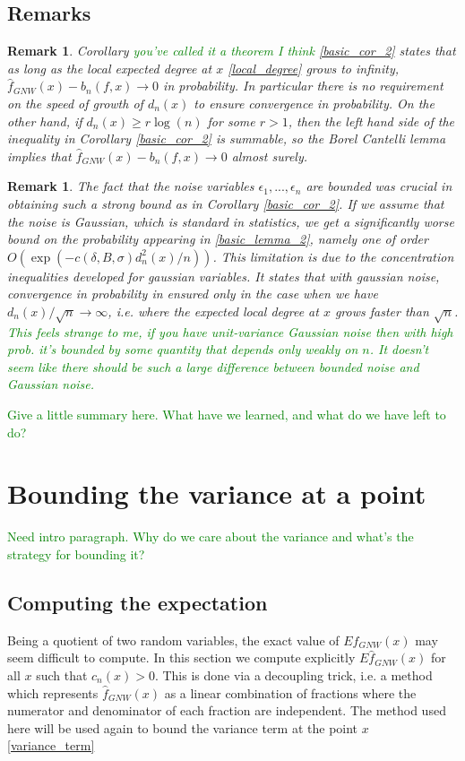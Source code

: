 \documentclass{article}
\newtheorem{remark}[theorem]{Remark}
\newcommand\SB[1]{\textcolor{green}{#1}}
\begin{document}
\subsection{Remarks}

\begin{remark}
Corollary \SB{you've called it a theorem I think} \ref{basic_cor_2} states that as long as the local expected degree at $x$ \ref{local_degree} grows to infinity, $\hat{f}_{GNW}(x)-b_n(f,x)\to 0$ in probability. In particular there is no requirement on the speed of growth of $d_n(x)$ to ensure convergence in probability. On the other hand, if $d_n(x)\geq r\log(n)$ for some $r>1$, then the left hand side of the inequality in Corollary \ref{basic_cor_2} is summable, so the Borel Cantelli lemma implies that $\hat{f}_{GNW}(x)-b_n(f,x)\to 0$ almost surely.
\end{remark}

\begin{remark}
The fact that the noise variables $\epsilon_1,...,\epsilon_n$ are bounded was
crucial in obtaining such a strong bound as in Corollary \ref{basic_cor_2}. If
we assume that the noise is Gaussian, which is standard in statistics, we get a
significantly worse bound on the probability appearing in \ref{basic_lemma_2},
namely one of order $O(\exp(-c(\delta,B,\sigma)d_n^2(x)/n))$. This limitation is
due to the concentration inequalities developed for gaussian variables. It
states that with gaussian noise, convergence in probability in ensured only in
the case when we have $d_n(x)/\sqrt{n}\to\infty$, i.e. where the expected local
degree at $x$ grows faster than $\sqrt{n}$. \SB{This feels strange to me, if you
have unit-variance Gaussian noise then with high prob. it's bounded by some
quantity that depends only weakly on $n$. It doesn't seem like there should be
such a large difference between bounded noise and Gaussian noise. }
\end{remark}

\SB{Give a little summary here. What have we learned, and what do we have left
  to do?}

\section{Bounding the variance at a point}

\SB{Need intro paragraph. Why do we care about the variance and what's the
  strategy for bounding it? }
\label{bounding_the_variance}
\subsection{Computing  the expectation }
Being a quotient of two random variables, the exact value of $E\hat{f}_{GNW}(x)$ may seem difficult to compute. In this section we compute explicitly  $E\hat{f}_{GNW}(x)$ for all $x$ such that $c_n(x)>0$. This is done via a decoupling trick, i.e. a method which represents $\hat{f}_{GNW}(x)$ as a linear combination of fractions where the numerator and denominator of each fraction are independent. The method used here will be used again to bound the variance term at the point $x$ \ref{variance_term}
\end{document}
